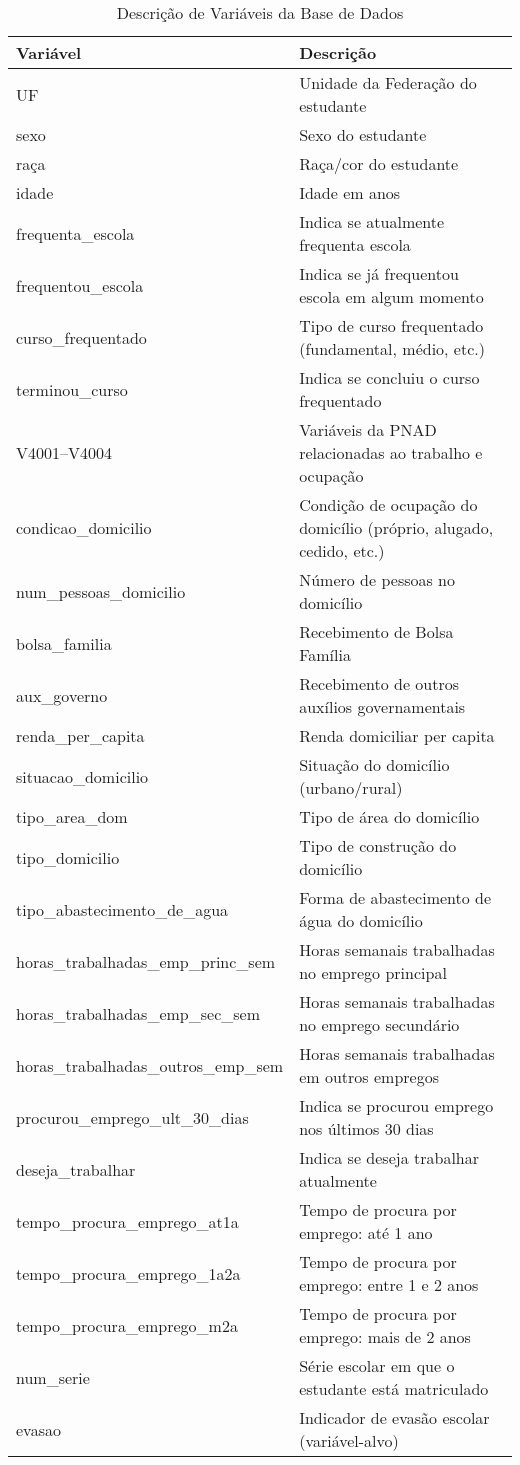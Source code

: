 \documentclass[english, spanish, brazilian]{RBIEarticle} %
\begin{document}
\begin{table}
\caption{Descrição de Variáveis da Base de Dados}
\centering
\label{tab:variables}
\begin{tabular}{lp{8cm}}
\hline
Variável & Descrição \\ \hline
UF & Unidade da Federação do estudante \\
sexo & Sexo do estudante \\
raça & Raça/cor do estudante \\
idade & Idade em anos \\
frequenta\_escola & Indica se atualmente frequenta escola \\
frequentou\_escola & Indica se já frequentou escola em algum momento \\
curso\_frequentado & Tipo de curso frequentado (fundamental, médio, etc.) \\
terminou\_curso & Indica se concluiu o curso frequentado \\
V4001--V4004 & Variáveis da PNAD relacionadas ao trabalho e ocupação \\
condicao\_domicilio & Condição de ocupação do domicílio (próprio, alugado, cedido, etc.) \\
num\_pessoas\_domicilio & Número de pessoas no domicílio \\
bolsa\_familia & Recebimento de Bolsa Família \\
aux\_governo & Recebimento de outros auxílios governamentais \\
renda\_per\_capita & Renda domiciliar per capita \\
situacao\_domicilio & Situação do domicílio (urbano/rural) \\
tipo\_area\_dom & Tipo de área do domicílio \\
tipo\_domicilio & Tipo de construção do domicílio \\
tipo\_abastecimento\_de\_agua & Forma de abastecimento de água do domicílio \\
horas\_trabalhadas\_emp\_princ\_sem & Horas semanais trabalhadas no emprego principal \\
horas\_trabalhadas\_emp\_sec\_sem & Horas semanais trabalhadas no emprego secundário \\
horas\_trabalhadas\_outros\_emp\_sem & Horas semanais trabalhadas em outros empregos \\
procurou\_emprego\_ult\_30\_dias & Indica se procurou emprego nos últimos 30 dias \\
deseja\_trabalhar & Indica se deseja trabalhar atualmente \\
tempo\_procura\_emprego\_at1a & Tempo de procura por emprego: até 1 ano \\
tempo\_procura\_emprego\_1a2a & Tempo de procura por emprego: entre 1 e 2 anos \\
tempo\_procura\_emprego\_m2a & Tempo de procura por emprego: mais de 2 anos \\
num\_serie & Série escolar em que o estudante está matriculado \\
evasao & Indicador de evasão escolar (variável-alvo) \\ \hline
\end{tabular}
\end{table}
\end{document}
